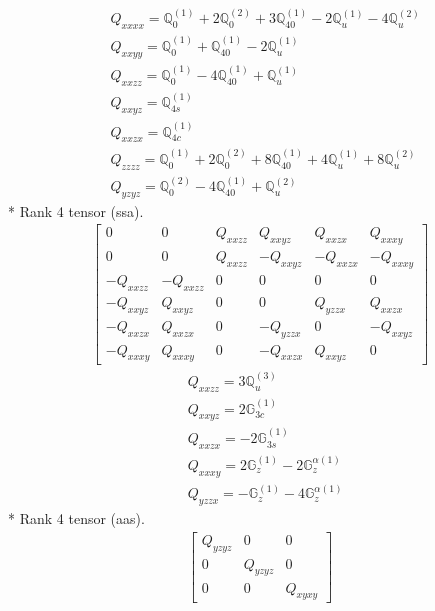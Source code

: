\documentclass[fleqn,8pt,landscape]{jsarticle}
\begin{document}
\begin{align*}
& Q_{xxxx} = \mathbb{Q}_{0}^{(1)} + 2 \mathbb{Q}_{0}^{(2)} + 3 \mathbb{Q}_{40}^{(1)} - 2 \mathbb{Q}_{u}^{(1)} - 4 \mathbb{Q}_{u}^{(2)} \\
& Q_{xxyy} = \mathbb{Q}_{0}^{(1)} + \mathbb{Q}_{40}^{(1)} - 2 \mathbb{Q}_{u}^{(1)} \\
& Q_{xxzz} = \mathbb{Q}_{0}^{(1)} - 4 \mathbb{Q}_{40}^{(1)} + \mathbb{Q}_{u}^{(1)} \\
& Q_{xxyz} = \mathbb{Q}_{4s}^{(1)} \\
& Q_{xxzx} = \mathbb{Q}_{4c}^{(1)} \\
& Q_{zzzz} = \mathbb{Q}_{0}^{(1)} + 2 \mathbb{Q}_{0}^{(2)} + 8 \mathbb{Q}_{40}^{(1)} + 4 \mathbb{Q}_{u}^{(1)} + 8 \mathbb{Q}_{u}^{(2)} \\
& Q_{yzyz} = \mathbb{Q}_{0}^{(2)} - 4 \mathbb{Q}_{40}^{(1)} + \mathbb{Q}_{u}^{(2)}
\end{align*}
* Rank 4 tensor (ssa).
\begin{align*}
\begin{bmatrix} 0 & 0 & Q_{xxzz} & Q_{xxyz} & Q_{xxzx} & Q_{xxxy} \\ 0 & 0 & Q_{xxzz} & - Q_{xxyz} & - Q_{xxzx} & - Q_{xxxy} \\ - Q_{xxzz} & - Q_{xxzz} & 0 & 0 & 0 & 0 \\ - Q_{xxyz} & Q_{xxyz} & 0 & 0 & Q_{yzzx} & Q_{xxzx} \\ - Q_{xxzx} & Q_{xxzx} & 0 & - Q_{yzzx} & 0 & - Q_{xxyz} \\ - Q_{xxxy} & Q_{xxxy} & 0 & - Q_{xxzx} & Q_{xxyz} & 0 \end{bmatrix}
\end{align*}
\begin{align*}
& Q_{xxzz} = 3 \mathbb{Q}_{u}^{(3)} \\
& Q_{xxyz} = 2 \mathbb{G}_{3c}^{(1)} \\
& Q_{xxzx} = - 2 \mathbb{G}_{3s}^{(1)} \\
& Q_{xxxy} = 2 \mathbb{G}_{z}^{(1)} - 2 \mathbb{G}_{z}^{\alpha(1)} \\
& Q_{yzzx} = - \mathbb{G}_{z}^{(1)} - 4 \mathbb{G}_{z}^{\alpha(1)}
\end{align*}
* Rank 4 tensor (aas).
\begin{align*}
\begin{bmatrix} Q_{yzyz} & 0 & 0 \\ 0 & Q_{yzyz} & 0 \\ 0 & 0 & Q_{xyxy} \end{bmatrix}
\end{align*}
\end{document}
